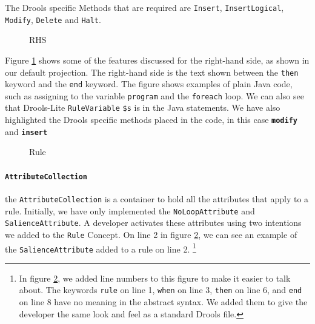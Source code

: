 The Drools specific Methods that are required are \texttt{Insert}, \texttt{InsertLogical}, \texttt{Modify}, \texttt{Delete} and \texttt{Halt}.

\begin{figure}
    \centering
    \caption{RHS}
    \label{fig:RHS}
\end{figure}

Figure \ref{fig:RHS} shows some of the features discussed for the right-hand side, as shown in our default projection.
The right-hand side is the text shown between the \texttt{then} keyword and the \texttt{end} keyword.
The figure shows examples of plain Java code, such as assigning to the variable \texttt{program} and the \texttt{foreach} loop.
We can also see that Drools-Lite \texttt{RuleVariable} \texttt{\$s} is in the Java statements.
We have also highlighted the Drools specific methods placed in the code, in this case \texttt{\textbf{modify}} and \texttt{\textbf{insert}}   

\begin{figure}
    \centering
    \caption{Rule}
    \label{fig:Rule}
\end{figure}

\paragraph{\texttt{AttributeCollection}} the \texttt{AttributeCollection} is a container to hold all the attributes that apply to a rule.
Initially, we have only implemented the \texttt{NoLoopAttribute} and \texttt{SalienceAttribute}.
A developer activates these attributes using two intentions we added to the \texttt{Rule} Concept.
On line 2 in figure \ref{fig:Rule}, we can see an example of the \texttt{SalienceAttribute} added to a rule on line 2.
\footnote{In figure \ref{fig:Rule}, we added line numbers to this figure to make it easier to talk about.
The keywords \texttt{rule} on line 1, \texttt{when} on line 3, \texttt{then} on line 6, and \texttt{end} on line 8 have no meaning in the abstract syntax.
We added them to give the developer the same look and feel as a standard Drools file.}

